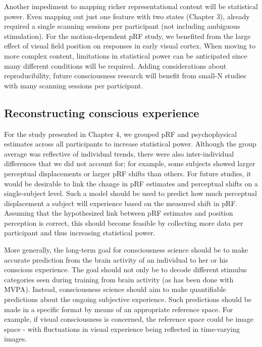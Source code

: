 Another impediment to mapping richer representational content will be statistical power. Even mapping out just one feature with two states (Chapter 3), already required a single scanning sessions per participant (not including ambiguous stimulation). For the motion-dependent pRF study, we benefited from the large effect of visual field position on responses in early visual cortex. When moving to more complex content, limitations in statistical power can be anticipated since many different conditions will be required. Adding considerations about reproducibility, future consciousness research will benefit from small-N studies with many scanning sessions per participant.

\subsection{Reconstructing conscious experience}
For the study presented in Chapter 4, we grouped pRF and psychophysical estimates across all participants to increase statistical power. Although the group average was reflective of individual trends, there were also inter-individual differences that we did not account for; for example, some subjects showed larger perceptual displacements or larger pRF shifts than others. For future studies, it would be desirable to link the change in pRF estimates and perceptual shifts on a single-subject level. Such a model should be used to predict how much perceptual displacement a subject will experience based on the measured shift in pRF. Assuming that the hypothesized link between pRF estimates and position perception is correct, this should become feasible by collecting more data per participant and thus increasing statistical power.

More generally, the long-term goal for consciousness science should be to make accurate prediction from the brain activity of an individual to her or his conscious experience. The goal should not only be to decode different stimulus categories seen during training from brain activity (as has been done with MVPA). Instead, consciousness science should aim to make quantifiable predictions about the ongoing subjective experience. Such predictions should be made in a specific format by means of an appropriate reference space. For example, if visual consciousness is concerned, the reference space could be image space - with fluctuations in visual experience being reflected in time-varying images.

